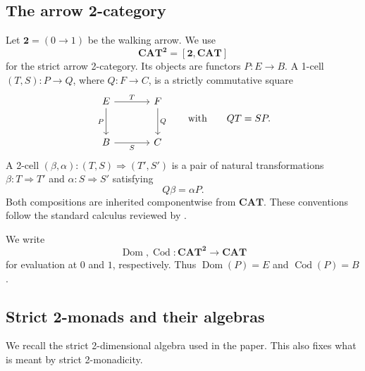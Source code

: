 \documentclass[11pt]{article}
\theoremstyle{plain}
\theoremstyle{definition}
\theoremstyle{remark}
\newcommand{\CAT}{\mathbf{CAT}}
\newcommand{\Dom}{\operatorname{Dom}}
\newcommand{\Cod}{\operatorname{Cod}}
\numberwithin{equation}{section}
\begin{document}
\subsection{The arrow 2-category}

Let $\mathbf 2=(0\to1)$ be the walking arrow.  We use
\begin{equation*}
\CAT^{\mathbf 2}=[\mathbf 2,\CAT]
\end{equation*}
for the strict arrow 2-category.  Its objects are functors
$P\colon E\to B$.  A 1-cell $(T,S)\colon P\to Q$, where
$Q\colon F\to C$, is a strictly commutative square
\begin{equation*}
\begin{tikzcd}[column sep=large,row sep=large]
E \arrow[r,"T"] \arrow[d,"P"'] & F \arrow[d,"Q"] \\
B \arrow[r,"S"'] & C
\end{tikzcd}
\qquad\text{with}\qquad QT=SP.
\end{equation*}
A 2-cell
$(\beta,\alpha)\colon(T,S)\Rightarrow(T',S')$ is a pair of
natural transformations $\beta\colon T\Rightarrow T'$ and
$\alpha\colon S\Rightarrow S'$ satisfying
\begin{equation}
Q\beta=\alpha P.
  \label{eq:arrow-2-cell}
\end{equation}
Both compositions are inherited componentwise from $\CAT$.
These conventions follow the standard calculus reviewed by
\citet{KellyStreet1974}.

We write
\begin{equation*}
\Dom,\Cod\colon\CAT^{\mathbf 2}\longrightarrow\CAT
\end{equation*}
for evaluation at $0$ and $1$, respectively.  Thus $\Dom(P)=E$ and
$\Cod(P)=B$.

\subsection{Strict 2-monads and their algebras}

We recall the strict 2-dimensional algebra used in the paper.  This
also fixes what is meant by strict 2-monadicity.
\end{document}
